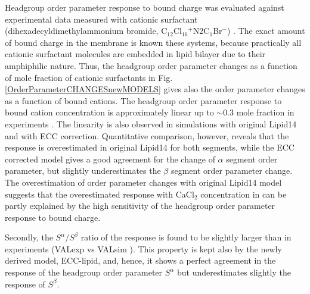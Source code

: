 \documentclass[aip,jcp,twocolumn]{revtex4}
\begin{document}
Headgroup order parameter response to bound charge was evaluated against
experimental data measured with cationic surfactant
(dihexadecyldimethylammonium bromide, C$_{12}$Cl$_{16}$$^+$N2C$_1$Br$^-$) \cite{scherer89}.
The exact amount of bound charge in the membrane is known these systems, because
practically all cationic surfactant molecules are embedded in lipid bilayer due to
their amphiphilic nature. Thus, the headgroup order parameter changes as a function of
mole fraction of cationic surfactants in  Fig. \ref{OrderParameterCHANGESnewMODELS} gives
also the order parameter changes as a function of bound cations.
The headgroup order parameter response to bound cation concentration
is approximately linear up to $\sim$0.3 mole fraction in experiments \cite{scherer89}.
The linearity is also observed in simulations with original Lipid14 and with ECC correction.
Quantitative comparison, however, reveals that the response is overestimated in 
original Lipid14 for both segments, while the ECC corrected model gives a
good agreement for the change of $\alpha$ segment order parameter, but slightly
underestimates the $\beta$ segment order parameter change.
The overestimation of order parameter changes with original Lipid14 model 
suggests that the overestimated response with CaCl$_2$ concentration in \cite{catte16} 
can be partly explained by the high sensitivity of the headgroup order parameter response
to bound charge.

Secondly, the $S^\alpha/S^\beta$ ratio of the response is found to be slightly larger than in 
experiments (VALexp vs VALsim
).
This property is kept also by the newly derived model, ECC-lipid, and, hence, 
it shows a perfect agreement in the response of the headgroup order parameter $S^\alpha$ 
but underestimates slightly the response of $S^\beta$. 
\end{document}
